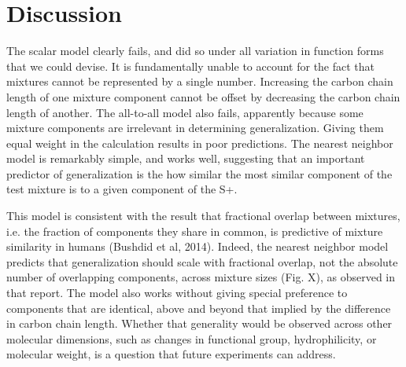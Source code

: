 \section{Discussion}

The scalar model clearly fails, and did so under all variation in function forms that we could devise.  It is fundamentally unable to account for the fact that mixtures cannot be represented by a single number.  Increasing the carbon chain length of one mixture component cannot be offset by decreasing the carbon chain length of another.  The all-to-all model also fails, apparently because some mixture components are irrelevant in determining generalization.  Giving them equal weight in the calculation results in poor predictions.  The nearest neighbor model is remarkably simple, and works well, suggesting that an important predictor of generalization is the how similar the most similar component of the test mixture is to a given component of the S+.  

This model is consistent with the result that fractional overlap between mixtures, i.e. the fraction of components they share in common, is predictive of mixture similarity in humans (Bushdid et al, 2014).  Indeed, the nearest neighbor model predicts that generalization should scale with fractional overlap, not the absolute number of overlapping components, across mixture sizes (Fig. X), as observed in that report.  The model also works without giving special preference to components that are identical, above and beyond that implied by the difference in carbon chain length.  Whether that generality would be observed across other molecular dimensions, such as changes in functional group, hydrophilicity, or molecular weight, is a question that future experiments can address.   
